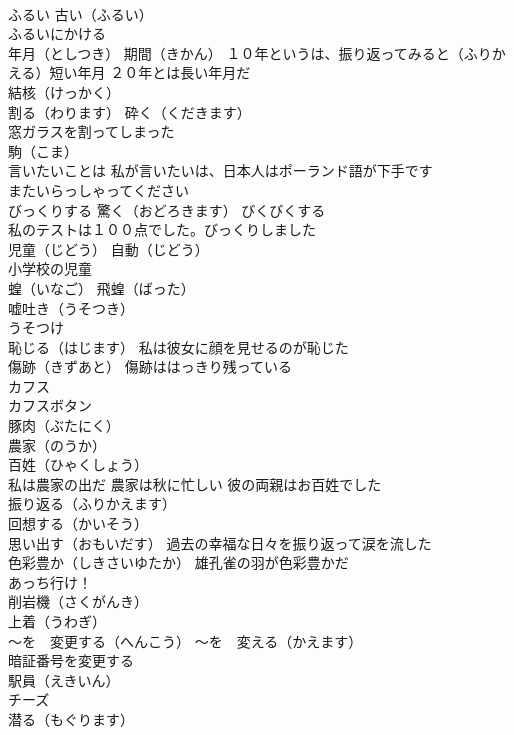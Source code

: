 \documentclass[8pt]{extreport}
\begin{document}
\begin{CJK}{UTF8}{min}
\\	ふるい 古い（ふるい）
\\	ふるいにかける
\\	年月（としつき） 期間（きかん） １０年というは、振り返ってみると（ふりかえる）短い年月 ２０年とは長い年月だ
\\	結核（けっかく）
\\	割る（わります） 砕く（くだきます）
\\	窓ガラスを割ってしまった
\\	駒（こま）
\\	言いたいことは 私が言いたいは、日本人はポーランド語が下手です
\\	またいらっしゃってください
\\	びっくりする 驚く（おどろきます） びくびくする 
\\	私のテストは１００点でした。びっくりしました
\\	児童（じどう） 自動（じどう）
\\	小学校の児童
\\	蝗（いなご） 飛蝗（ばった）
\\	嘘吐き（うそつき） 
\\	うそつけ 
\\	恥じる（はじます） 私は彼女に顔を見せるのが恥じた
\\	傷跡（きずあと） 傷跡ははっきり残っている
\\	カフス 
\\	カフスボタン 
\\	豚肉（ぶたにく）
\\	農家（のうか） 
\\	百姓（ひゃくしょう） 
\\	私は農家の出だ 農家は秋に忙しい 彼の両親はお百姓でした
\\	振り返る（ふりかえます） 
\\	回想する（かいそう）
\\	思い出す（おもいだす） 過去の幸福な日々を振り返って涙を流した
\\	色彩豊か（しきさいゆたか） 雄孔雀の羽が色彩豊かだ
\\	あっち行け！
\\	削岩機（さくがんき）
\\	上着（うわぎ）
\\	～を　変更する（へんこう） ～を　変える（かえます）
\\	暗証番号を変更する
\\	駅員（えきいん）
\\	チーズ
\\	潜る（もぐります） 

\end{CJK}
\end{document}
